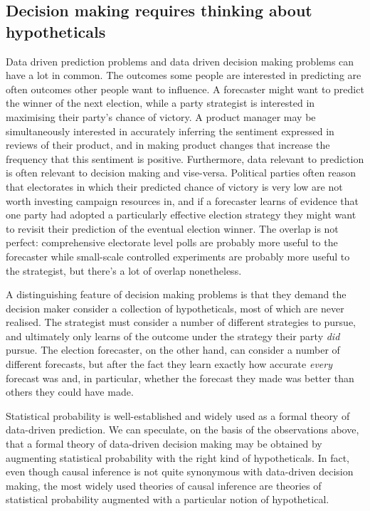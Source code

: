 \subsection[Hypotheticals]{Decision making requires thinking about hypotheticals}\label{sec:assumptions}

Data driven prediction problems and data driven decision making problems can have a lot in common. The outcomes some people are interested in predicting are often outcomes other people want to influence. A forecaster might want to predict the winner of the next election, while a party strategist is interested in maximising their party's chance of victory. A product manager may be simultaneously interested in accurately inferring the sentiment expressed in reviews of their product, and in making product changes that increase the frequency that this sentiment is positive. Furthermore, data relevant to prediction is often relevant to decision making and vise-versa. Political parties often reason that electorates in which their predicted chance of victory is very low are not worth investing campaign resources in, and if a forecaster learns of evidence that one party had adopted a particularly effective election strategy they might want to revisit their prediction of the eventual election winner. The overlap is not perfect: comprehensive electorate level polls are probably more useful to the forecaster while small-scale controlled experiments are probably more useful to the strategist, but there's a lot of overlap nonetheless.

A distinguishing feature of decision making problems is that they demand the decision maker consider a collection of hypotheticals, most of which are never realised. The strategist must consider a number of different strategies to pursue, and ultimately only learns of the outcome under the strategy their party \emph{did} pursue. The election forecaster, on the other hand, can consider a number of different forecasts, but after the fact they learn exactly how accurate \emph{every} forecast was and, in particular, whether the forecast they made was better than others they could have made.

Statistical probability is well-established and widely used as a formal theory of data-driven prediction. We can speculate, on the basis of the observations above, that a formal theory of data-driven decision making may be obtained by augmenting statistical probability with the right kind of hypotheticals. In fact, even though causal inference is not quite synonymous with data-driven decision making, the most widely used theories of causal inference are theories of statistical probability augmented with a particular notion of hypothetical.

